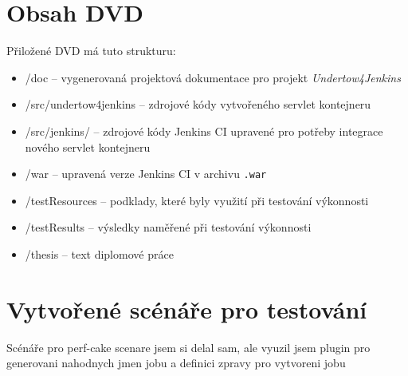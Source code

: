 
\chapter{Obsah DVD}
    Přiložené DVD má tuto strukturu:
    \begin{itemize}
        \item /doc -- vygenerovaná projektová dokumentace pro projekt \emph{Undertow4Jenkins}
        \item /src/undertow4jenkins -- zdrojové kódy vytvořeného servlet kontejneru
        \item /src/jenkins/ -- zdrojové kódy Jenkins CI upravené pro potřeby integrace nového servlet kontejneru
        \item /war -- upravená verze Jenkins CI v archivu \texttt{.war} 
        \item /testResources -- podklady, které byly využití při testování výkonnosti
        \item /testResults -- výsledky naměřené při testování výkonnosti
        \item /thesis -- text diplomové práce
    \end{itemize}

\chapter{Vytvořené scénáře pro testování} \label{prilohaScenare}
    Scénáře pro perf-cake
    scenare jsem si delal sam, ale vyuzil jsem plugin pro generovani nahodnych jmen jobu a definici zpravy pro vytvoreni jobu

\begin{verbatim}
\end{verbatim}



\begin{verbatim}
\end{verbatim}

\begin{verbatim}
\end{verbatim}



